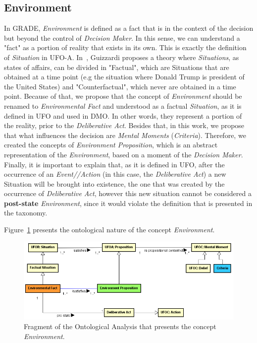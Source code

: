 \subsection{Environment}


In GRADE, \textit{Environment} is defined as a fact that is in the context of the decision but beyond the control of \textit{Decision Maker}. In this sense, we can understand a "fact" as a portion of reality that exists in its own. This is exactly the definition of \textit{Situation} in UFO-A. In~\cite{guizzardi-et-al:er13}, Guizzardi proposes a theory where \textit{Situations}, as states of affairs, can be divided in "Factual", which are Situations that are obtained at a time point (e.g the situation where Donald Trump is president of the United States) and "Counterfactual", which never are obtained in a time point. Because of that, we propose that the concept of \textit{Environment} should be renamed to \textit{Environmental Fact} and understood as a factual \textit{Situation}, as it is defined in UFO and used in DMO. In other words, they represent a portion of the reality, prior to the \textit{Deliberative Act}. Besides that, in this work, we propose that what influences the decision are \textit{Mental Moments} (\textit{Criteria}). Therefore, we created the concepts of \textit{Environment Proposition}, which is an abstract representation of the \textit{Environment}, based on a moment of the \textit{Decision Maker}. Finally, it is important to explain that, as it is defined in UFO, after the occurrence of an \textit{Event//Action} (in this case, the \textit{Deliberative Act}) a new Situation will be brought into existence, the one that was created by the occurrence of \textit{Deliberative Act}, however this new situation cannot be considered a \textbf{post-state} \textit{Environment}, since it would violate the definition that is presented in the taxonomy.


Figure~\ref{fig-ontology-environment} presents the ontological nature of the concept \textit{Environment}.

\begin{figure}
	\centering
	\includegraphics[width=\textwidth]{figuras/fig-ontology-environment} 
	\caption{Fragment of the Ontological Analysis that presents the concept \textit{Environment}.}
	\label{fig-ontology-environment}
\end{figure}